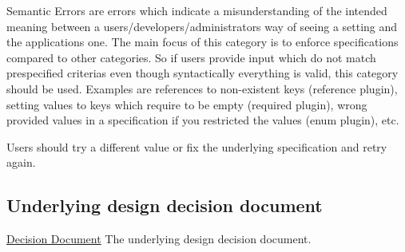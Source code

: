 {\ttfamily Semantic Errors} are errors which indicate a misunderstanding of the intended meaning between a user\textquotesingle{}s/developer\textquotesingle{}s/administrator\textquotesingle{}s way of seeing a setting and the application\textquotesingle{}s one. The main focus of this category is to enforce specifications compared to other categories. So if users provide input which do not match prespecified criterias even though syntactically everything is valid, this category should be used. Examples are references to non-\/existent keys ({\ttfamily reference} plugin), setting values to keys which require to be empty ({\ttfamily required} plugin), wrong provided values in a specification if you restricted the values ({\ttfamily enum} plugin), etc.

Users should try a different value or fix the underlying specification and retry again.

\subsection*{Underlying design decision document}


\begin{DoxyItemize}
\item \hyperlink{doc_decisions_error_codes_md}{Decision Document} The underlying design decision document. 
\end{DoxyItemize}